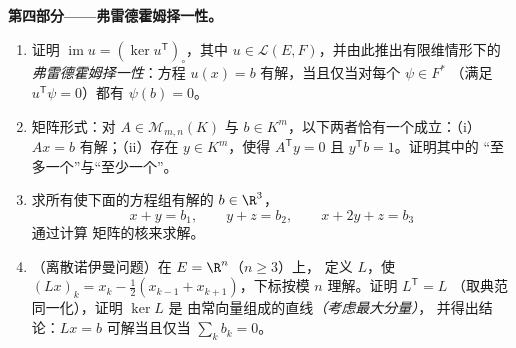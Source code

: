 \begin{problem}
\medskip
\noindent\textbf{第四部分——弗雷德霍姆择一性。}
\begin{enumerate}[resume]
  \item 证明 $\operatorname{im} u = (\ker u^{\mathsf
        T})_\circ$，其中 $u \in \mathcal{L}(E, F)$，并由此推出有限维情形下的
        \emph{弗雷德霍姆择一性}：方程
        $u(x) = b$ 有解，当且仅当对每个 $\psi \in F^*$
        （满足 $u^{\mathsf T}\psi = 0$）都有
        $\psi(b) = 0$。
  \item 矩阵形式：对 $A \in \mathcal{M}_{m,n}(K)$ 与 $b \in
        K^m$，以下两者恰有一个成立：（i）$Ax = b$
        有解；（ii）存在 $y \in K^m$，使得
        $A^{\mathsf T}y = 0$ 且 $y^{\mathsf T}b = 1$。证明其中的
        “至多一个”与“至少一个”。
  \item 求所有使下面的方程组有解的 $b \in \R^3$，
        \[
        x + y = b_1, \qquad y + z = b_2, \qquad x + 2y + z = b_3
        \]
        通过计算
        矩阵的核来求解。
  \item （离散诺伊曼问题）在 $E = \R^n$（$n \geq 3$）上，
        定义 $L$，使 $(Lx)_k = x_k - \frac12(x_{k-1} +
        x_{k+1})$，下标按模 $n$ 理解。证明 $L^{\mathsf T} = L$
        （取典范同一化），证明 $\ker L$ 是
        由常向量组成的直线\emph{（考虑最大分量）}，
        并得出结论：$Lx = b$ 可解当且仅当 $\sum_k b_k = 0$。
\end{enumerate}


\end{problem}
